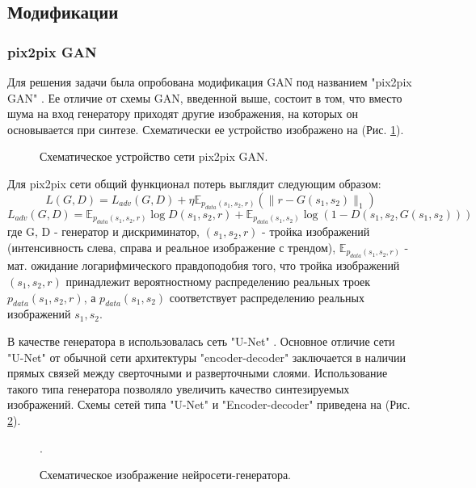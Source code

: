 	\subsection{Модификации}
		\subsubsection{pix2pix GAN}
			Для решения задачи была опробована модификация GAN под названием "pix2pix GAN" \cite{pix2pix, p2p-vessnet}. Ее отличие от схемы GAN, введенной выше, состоит в том, что вместо шума на вход генератору приходят другие изображения, на которых он основывается при синтезе. Схематически ее устройство изображено на (Рис. \ref{5-p2p}).
			
			\begin{figure}[h]
				\caption{Схематическое устройство сети pix2pix GAN.}
				\label{5-p2p}
			\end{figure}
			
			Для pix2pix сети общий функционал потерь выглядит следующим образом: $$ L(G, D) = L_{adv}(G, D) + \eta \mathbb{E}_{p_{data}(s_1, s_2, r)} (\parallel r - G(s_1, s_2) \parallel_1)$$
			$$ L_{adv}(G, D) = \mathbb{E}_{p_{data}(s_1, s_2, r)}\log D(s_1, s_2, r) +  \mathbb{E}_{p_{data}(s_1, s_2)} \log (1 - D(s_1, s_2, G(s_1, s_2)))$$
			где G, D - генератор и дискриминатор, $(s_1, s_2, r)$ - тройка изображений (интенсивность слева, справа и реальное изображение с трендом),  $\mathbb{E}_{p_{data}(s_1, s_2, r)}$ - мат. ожидание логарифмического правдоподобия того, что тройка изображений $(s_1, s_2, r)$ принадлежит вероятностному распределению реальных троек $p_{data}(s_1, s_2, r)$, а $p_{data}(s_1, s_2)$ соответствует распределению реальных изображений $s_1, s_2$.
			
			В качестве генератора в \cite{pix2pix, p2p-vessnet} использовалась сеть "U-Net" \cite{unet}. Основное отличие сети "U-Net" от обычной сети архитектуры "encoder-decoder" заключается в наличии прямых связей между сверточными и разверточными слоями. Использование такого типа генератора позволяло увеличить качество синтезируемых изображений. Схемы сетей типа "U-Net" и "Encoder-decoder" приведена на (Рис. \ref{5-unet-sheme}).
			\begin{figure}[h]
				\caption{Схематическое изображение нейросети-генератора.}
				\label{5-unet-sheme}.
			\end{figure}
			
			